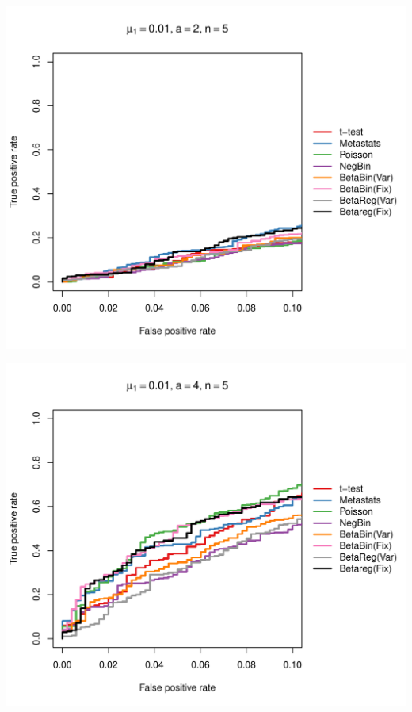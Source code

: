\documentclass[12pt]{article}\usepackage{graphicx, color}
\makeatletter
\def\maxwidth{ %
  \ifdim\Gin@nat@width>\linewidth
    \linewidth
  \else
    \Gin@nat@width
  \fi
}
\newenvironment{knitrout}{}{} %
\makeatother
\begin{document}
\begin{knitrout}
{\centering \includegraphics[width=\maxwidth]{figure/rocs11} 

}




{\centering \includegraphics[width=\maxwidth]{figure/rocs12} 

}





\end{knitrout}
\end{document}
